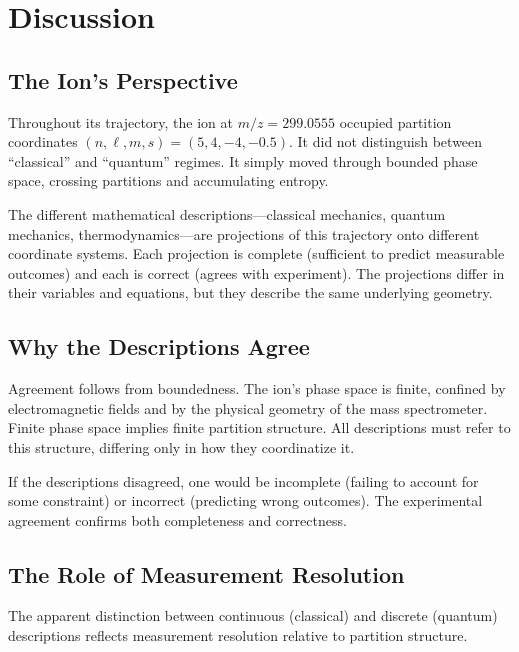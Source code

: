 \documentclass[twocolumn,10pt]{article}
\theoremstyle{remark}
\begin{document}
\section{Discussion}
\label{sec:discussion}

\subsection{The Ion's Perspective}

Throughout its trajectory, the ion at $m/z = 299.0555$ occupied partition coordinates $(n, \ell, m, s) = (5, 4, -4, -0.5)$. It did not distinguish between ``classical'' and ``quantum'' regimes. It simply moved through bounded phase space, crossing partitions and accumulating entropy.

The different mathematical descriptions---classical mechanics, quantum mechanics, thermodynamics---are projections of this trajectory onto different coordinate systems. Each projection is complete (sufficient to predict measurable outcomes) and each is correct (agrees with experiment). The projections differ in their variables and equations, but they describe the same underlying geometry.

\subsection{Why the Descriptions Agree}

Agreement follows from boundedness. The ion's phase space is finite, confined by electromagnetic fields and by the physical geometry of the mass spectrometer. Finite phase space implies finite partition structure. All descriptions must refer to this structure, differing only in how they coordinatize it.

If the descriptions disagreed, one would be incomplete (failing to account for some constraint) or incorrect (predicting wrong outcomes). The experimental agreement confirms both completeness and correctness.

\subsection{The Role of Measurement Resolution}

The apparent distinction between continuous (classical) and discrete (quantum) descriptions reflects measurement resolution relative to partition structure.
\end{document}
